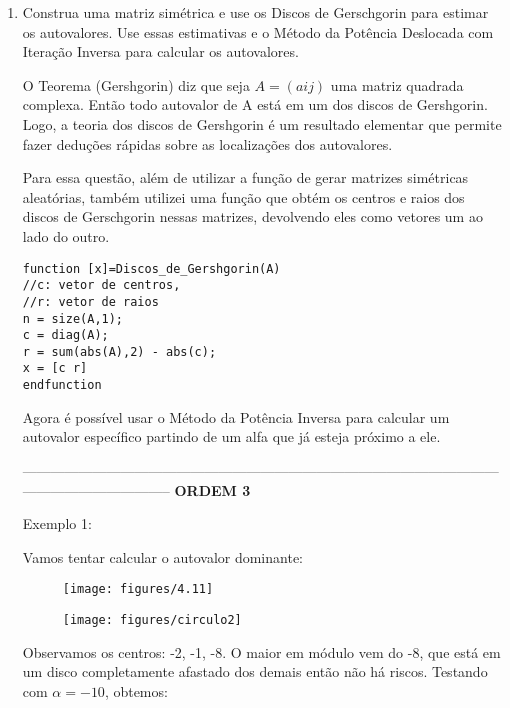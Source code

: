 \documentclass[leqno]{article}
\numberwithin{equation}{section}
\begin{document}
\begin{enumerate}
		--------------------------------------------------------------------------------------------------------------------------------------
		\item Construa uma matriz simétrica e use os Discos de Gerschgorin para estimar
		os autovalores. Use essas estimativas e o Método da Potência Deslocada com
		Iteração Inversa para calcular os autovalores.
		
		O Teorema (Gershgorin) diz que seja $A=(aij)$ uma matriz quadrada complexa. Então todo autovalor de A está em um dos discos de Gershgorin. Logo,
		a teoria dos discos de Gershgorin é um resultado elementar que permite fazer deduções rápidas sobre as localizações dos autovalores. 	
		
		Para essa questão, além de utilizar a função de gerar matrizes simétricas aleatórias, também utilizei uma função que obtém os centros e raios dos discos de Gerschgorin nessas matrizes, devolvendo eles como vetores um ao lado do outro.
			
		\begin{sol}	\begin{lstlisting}
function [x]=Discos_de_Gershgorin(A)
//c: vetor de centros,
//r: vetor de raios
n = size(A,1);
c = diag(A);
r = sum(abs(A),2) - abs(c);
x = [c r]
endfunction
		\end{lstlisting}
	
		Agora é possível usar o Método da Potência Inversa para calcular um autovalor específico partindo de um alfa que já esteja próximo a ele. 
		\end{sol}		
	
		--------------------------------------------------------------------------------------------------------------------------------------
		\textbf{{\large ORDEM 3}}
		
		Exemplo 1:
		
		Vamos tentar calcular o autovalor dominante:
		
		\begin{figure}[H]
			\centering
			\texttt{[image: figures/4.11]}
		\end{figure}
	
		\begin{figure}[H]
			\centering
			\texttt{[image: figures/circulo2]}
		\end{figure}
	
		Observamos os centros: -2, -1, -8. O maior em módulo vem do -8, que está em um disco completamente afastado dos demais então não há riscos. Testando com $\alpha = -10$, obtemos:
	

\end{enumerate}
\end{document}
